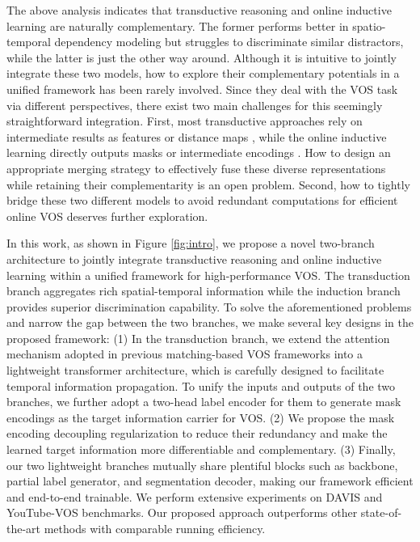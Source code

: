 \documentclass[10pt,twocolumn,letterpaper]{article}
\begin{document}
The above analysis indicates that transductive reasoning and online inductive learning are naturally complementary. The former performs better in spatio-temporal dependency modeling but struggles to discriminate similar distractors, while the latter is just the other way around. Although it is intuitive to jointly integrate these two models, how to explore their complementary potentials in a unified framework has been rarely involved. Since they deal with the VOS task via different perspectives, there exist two main challenges for this seemingly straightforward integration. First, most transductive approaches rely on intermediate results as features \cite{Seoung2019A,Seong2020A,li2020A,lu2020A} or distance maps \cite{feelvos2019A,CFBI2020A}, while the online inductive learning directly outputs masks \cite{META2019A,frtm2020A} or intermediate encodings \cite{Goutam2020A}. How to design an appropriate merging strategy to effectively fuse these diverse representations while retaining their complementarity is an open problem.
Second, how to tightly bridge these two different models to avoid redundant computations for efficient online VOS deserves further exploration.

In this work, as shown in Figure \ref{fig:intro}, we propose a novel two-branch architecture to jointly integrate transductive reasoning and online inductive learning within a unified framework for high-performance VOS. 
The transduction branch aggregates rich spatial-temporal information while the induction branch provides superior discrimination capability.
To solve the aforementioned problems and narrow the gap between the two branches, we make several key designs in the proposed framework:
(1) In the transduction branch, we extend the attention mechanism adopted in previous matching-based VOS frameworks \cite{Seoung2019A,Zhang2020A,Seong2020A} into a lightweight transformer \cite{DETR2020A,transformer2017A} architecture, which is carefully designed to facilitate temporal information propagation.
To unify the inputs and outputs of the two branches, we further adopt a two-head label encoder for them to generate mask encodings as the target information carrier for VOS.
(2) We propose the mask encoding decoupling regularization to reduce their redundancy and make the learned target information more differentiable and complementary.
(3) Finally, our two lightweight branches mutually share plentiful blocks such as backbone,  partial label generator, and segmentation decoder, making our framework efficient and end-to-end trainable.
We perform extensive experiments on DAVIS \cite{DAVIS2017} and YouTube-VOS \cite{Xu2018YouTubeVOSAL} benchmarks. Our proposed approach outperforms other state-of-the-art methods with comparable running efficiency.
\end{document}
